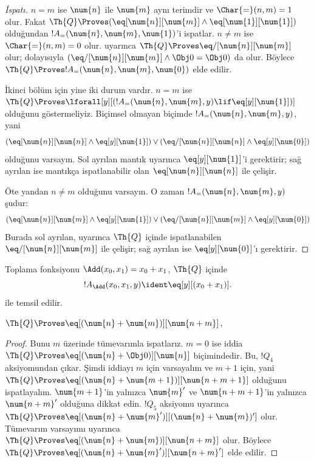 \begin{proof}[ İspatı]
$n=m$ ise $\num{n}$ ile $\num{m}$ aynı terimdir ve $\Char{=}(n,m)=1$ olur.
Fakat $\Th{Q} \Proves (\eq[\num{n}][\num{m}] \land
\eq[\num{1}][\num{1}])$ olduğundan $!A_=(\num{n},\num{m},\num{1})$'i
ispatlar. $n\neq m$ ise $\Char{=}(n,m)=0$ olur.
 uyarınca $\Th{Q} \Proves
\eq/[\num{n}][\num{m}]$ olur; dolayısıyla
$(\eq/[\num{n}][\num{m}] \land \Obj 0 = \Obj 0)$ da olur. Böylece
$\Th{Q} \Proves !A_=(\num{n}, \num{m}, \num{0})$ elde edilir.

İkinci bölüm için yine iki durum vardır. $n=m$ ise
$\Th{Q} \Proves \lforall[y][(!A_=(\num{n}, \num{m}, y)
  \lif \eq[y][\num{1}])]$ olduğunu göstermeliyiz. Biçimsel olmayan biçimde
$!A_=(\num{n},\num{m},y)$, yani
\[
(\eq[\num{n}][\num{n}] \land \eq[y][\num{1}]) \lor
(\eq/[\num{n}][\num{n}] \land \eq[y][\num{0}])
\]
olduğunu varsayın. Sol ayrılan mantık uyarınca $\eq[y][\num{1}]$'i
gerektirir; sağ ayrılan ise mantıkça ispatlanabilir olan
$\eq[\num{n}][\num{n}]$ ile çelişir.

Öte yandan $n\neq m$ olduğunu varsayın. O zaman
$!A_=(\num{n},\num{m},y)$ şudur:
\[
(\eq[\num{n}][\num{m}] \land \eq[y][\num{1}]) \lor
(\eq/[\num{n}][\num{m}] \land \eq[y][\num{0}])
\]
Burada sol ayrılan,  uyarınca $\Th{Q}$ içinde
ispatlanabilen $\eq/[\num{n}][\num{m}]$ ile çelişir; sağ ayrılan ise
$\eq[y][\num{0}]$'ı gerektirir.
\end{proof}

\begin{prop}
Toplama fonksiyonu $\Add(x_0,x_1)=x_0+x_1$, $\Th{Q}$ içinde
\[
  !A_{\Add}(x_0, x_1, y) \ident \eq[y][(x_0 + x_1)].
\]
ile temsil edilir.
\end{prop}

\begin{lem}
$\Th{Q} \Proves \eq[(\num{n} + \num{m})][\num{n+m}]$,
\end{lem}

\begin{proof}
Bunu $m$ üzerinde tümevarımla ispatlarız. $m=0$ ise iddia
$\Th{Q} \Proves \eq[(\num{n} + \Obj 0)][\num{n}]$ biçimindedir. Bu,
$!Q_4$ aksiyomundan çıkar. Şimdi iddiayı $m$ için varsayalım ve $m+1$ için,
yani $\Th{Q} \Proves \eq[(\num{n} +
  \num{m+1})][\num{n+m+1}]$ olduğunu ispatlayalım. $\num{m+1}$'in yalnızca
$\num{m}'$ ve $\num{n+m+1}$'in yalnızca $\num{n+m}'$ olduğuna dikkat edin.
$!Q_5$ aksiyomu uyarınca
$\Th{Q} \Proves \eq[(\num{n} + \num{m}')][(\num{n}+\num{m})']$ olur.
Tümevarım varsayımı uyarınca
$\Th{Q} \Proves \eq[(\num{n} + \num{m})][\num{n+m}]$ olur. Böylece
$\Th{Q} \Proves \eq[(\num{n} + \num{m}')][\num{n+m}']$ elde edilir.
\end{proof}

